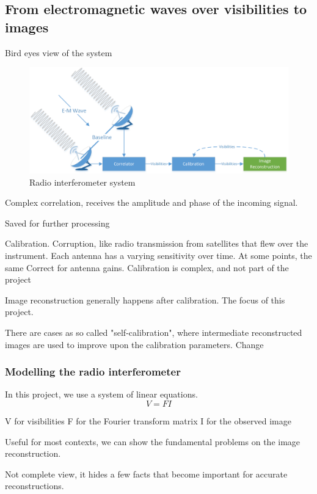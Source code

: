 \subsection{From electromagnetic waves over visibilities to images}
Bird eyes view of the system

\begin{figure}[h]
	\centering
	\includegraphics[width=0.80\linewidth]{./chapters/01.intro/system.png}
	\caption{Radio interferometer system}
	\label{intro:system}
\end{figure}

Complex correlation, receives the amplitude and phase of the incoming signal.

Saved for further processing

Calibration.
Corruption, like radio transmission from satellites that flew over the instrument.
Each antenna has a varying sensitivity over time. At some points, the same 
Correct for antenna gains.
Calibration is complex, and not part of the project

Image reconstruction generally happens after calibration. The focus of this project.

There are cases as so called "self-calibration", where intermediate reconstructed images are used to improve upon the calibration parameters.
Change

\subsubsection{Modelling the radio interferometer}

In this project, we use a system of linear equations.
\begin{equation}\label{intro2:model:linear}
V = F I
\end{equation}

V for visibilities
F for the Fourier transform matrix
I for the observed image

Useful for most contexts, we can show the fundamental problems on the image reconstruction. 

Not complete view, it hides a few facts that become important for accurate reconstructions. 

